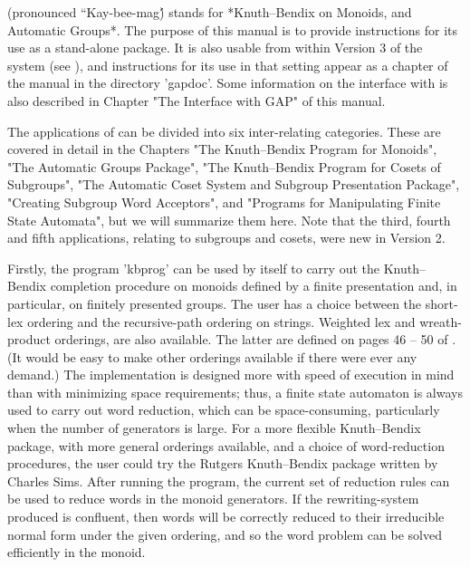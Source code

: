 {\KBMAG} (pronounced ``Kay-bee-mag\'\')
stands for *Knuth--Bendix on Monoids, and Automatic Groups*.
The purpose of this manual is to provide instructions for its use as a
stand-alone package.  It is also usable from within Version 3 of the {\GAP}
system (see \cite{Sch92}), and instructions for its use in that setting appear
as a chapter of the {\GAP} manual in the directory 'gapdoc'.
Some information on the interface with {\GAP} is also described in Chapter
"The Interface with GAP" of this manual.

The applications of {\KBMAG} can be divided into six inter-relating
categories. These are covered in detail in the Chapters
"The Knuth--Bendix Program for Monoids",
"The Automatic Groups Package",
"The Knuth--Bendix Program for Cosets of Subgroups",
"The Automatic Coset System and Subgroup Presentation Package",
"Creating Subgroup Word Acceptors", and
"Programs for Manipulating Finite State Automata",
but we will summarize them here.
Note that the third, fourth and fifth applications, relating to subgroups and
cosets, were new in Version 2.

Firstly, the program 'kbprog' can be used by itself to carry out the
Knuth--Bendix completion procedure on monoids defined by a finite presentation
and, in particular, on finitely presented groups. The user has a choice
between the short-lex ordering and the recursive-path ordering on strings.
Weighted lex and wreath-product orderings, are also available.
The latter are defined on pages 46 -- 50 of \cite{Sims94}.
(It would be easy to make other orderings available if there were ever any
demand.) The implementation is designed more with speed of execution in mind
than with minimizing space requirements; thus, a finite state automaton is
always used to carry out word reduction, which can be space-consuming,
particularly when the number of generators is large. For a more flexible
Knuth--Bendix package, with more general orderings available, and a
choice of word-reduction procedures, the user could try the Rutgers
Knuth--Bendix package {\rkbp} written by Charles Sims. 
After running the program, the current set of reduction rules can be used to
reduce words in the monoid generators. If the rewriting-system produced is
confluent, then words will be correctly reduced to their irreducible normal
form under the given ordering, and so the word problem can be solved efficiently
in the monoid.

